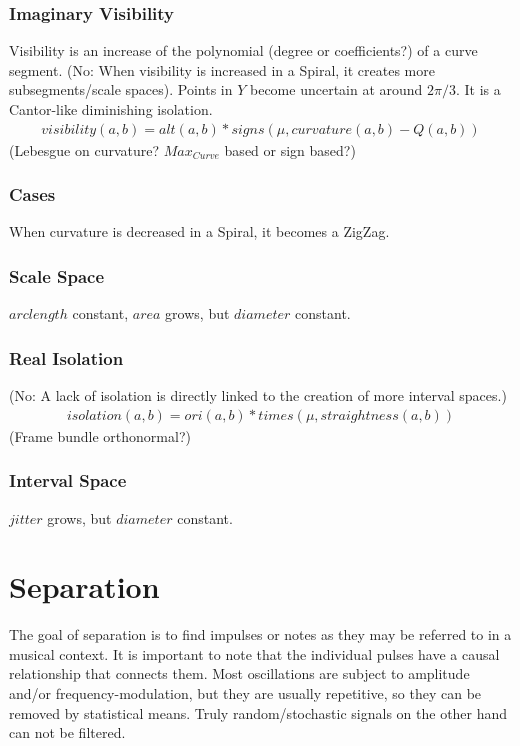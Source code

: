 \documentclass{report}
\begin{document}
\subsection{Imaginary Visibility}
Visibility is an increase of the polynomial (degree or coefficients?) of a curve segment.
(No: When visibility is increased in a Spiral, it creates more subsegments/scale spaces). Points in $Y$ become uncertain at around $2\pi/3$. It is a Cantor-like diminishing isolation.
\begin{align}
visibility(a,b)= alt(a,b) * signs(\mu,curvature(a,b)-Q(a,b))
\end{align}
(Lebesgue on curvature? $Max_{Curve}$ based or sign based?)
\subsection*{Cases}
When curvature is decreased in a Spiral, it becomes a ZigZag.
\subsection*{Scale Space}
$arclength$ constant, $area$ grows, but $diameter$ constant.

\subsection{Real Isolation}
(No: A lack of isolation is directly linked to the creation of more interval spaces.)
\begin{align}
isolation(a,b) = ori(a,b)*times(\mu,straightness(a,b))
\end{align}
(Frame bundle orthonormal?)
\subsection*{Interval Space}
$jitter$ grows, but $diameter$ constant.

\chapter{Separation}
The goal of separation is to find impulses or notes as they may be referred to in a musical context. It is important to note that the individual pulses have a causal relationship that connects them. Most oscillations are subject to amplitude and/or frequency-modulation, but they are usually repetitive, so they can be removed by statistical means. Truly random/stochastic signals on the other hand can not be filtered.
\end{document}
